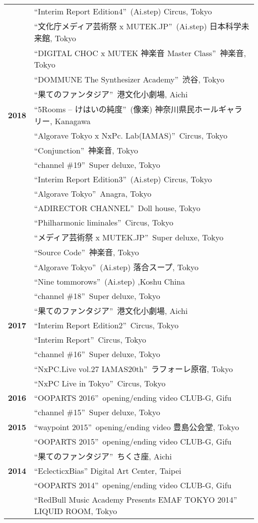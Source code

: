 \documentclass[8pt,a4paper]{article}
\begin{document}
\begin{longtable}{@{}p{1.2cm}@{\hspace{0.5cm}}p{14cm}@{}}
& ``Interim Report Edition4''\, (Ai.step) Circus, Tokyo \\
& ``文化庁メディア芸術祭 x MUTEK.JP''\, (Ai.step) 日本科学未来館, Tokyo \\
& ``DIGITAL CHOC x MUTEK 神楽音 Master Class''\, 神楽音, Tokyo \\
& ``DOMMUNE The Synthesizer Academy''\, 渋谷, Tokyo \\
& ``果てのファンタジア''\, 港文化小劇場, Aichi \\[0.2em]
\textbf{2018} & ``5Rooms – けはいの純度''\, (像楽) 神奈川県民ホールギャラリー, Kanagawa \\
& ``Algorave Tokyo x NxPc. Lab(IAMAS)''\, Circus, Tokyo \\
& ``Conjunction''\, 神楽音, Tokyo \\
& ``channel \#19''\, Super deluxe, Tokyo \\
& ``Interim Report Edition3''\, (Ai.step) Circus, Tokyo \\
& ``Algorave Tokyo''\, Anagra, Tokyo \\
& ``ADIRECTOR CHANNEL''\, Doll house, Tokyo \\
& ``Philharmonic liminales''\, Circus, Tokyo \\
& ``メディア芸術祭 x MUTEK.JP''\, Super deluxe, Tokyo \\
& ``Source Code''\, 神楽音, Tokyo \\
& ``Algorave Tokyo''\, (Ai.step) 落合スープ, Tokyo \\
& ``Nine tommorows''\, (Ai.step) ,Koshu China \\
& ``channel \#18''\, Super deluxe, Tokyo \\
& ``果てのファンタジア''\, 港文化小劇場, Aichi \\[0.2em]
\textbf{2017} & ``Interim Report Edition2''\, Circus, Tokyo \\
& ``Interim Report''\, Circus, Tokyo \\
& ``channel \#16''\, Super deluxe, Tokyo \\
& ``NxPC.Live vol.27 IAMAS20th''\, ラフォーレ原宿, Tokyo \\
& ``NxPC Live in Tokyo''\, Circus, Tokyo \\[0.2em]
\textbf{2016} & ``OOPARTS 2016''\, opening/ending video CLUB-G, Gifu \\
& ``channel \#15''\, Super deluxe, Tokyo \\[0.2em]
\textbf{2015} & ``waypoint 2015''\, opening/ending video 豊島公会堂, Tokyo \\
& ``OOPARTS 2015''\, opening/ending video CLUB-G, Gifu \\
& ``果てのファンタジア''\, ちくさ座, Aichi \\[0.2em]
\textbf{2014} & ``EclecticxBias'' Digital Art Center, Taipei \\
& ``OOPARTS 2014''\, opening/ending video CLUB-G, Gifu \\
& ``RedBull Music Academy Presents EMAF TOKYO 2014'' LIQUID ROOM, Tokyo \\
\end{longtable}
\end{document}
